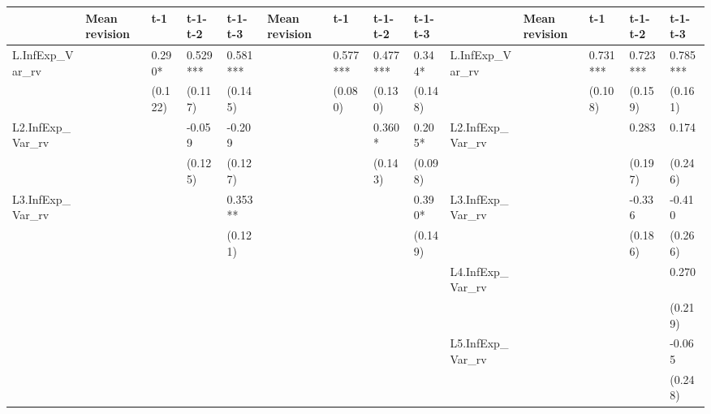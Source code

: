 \documentclass[12pt]{article}
\begin{document}
\begin{table}
\begin{adjustbox}{width={24cm},totalheight={14cm}}
\begin{threeparttable}
\begin{tabular}{llllllllllllll}
					\hline                                                                                                                     
					& Mean revision & t-1       & t-1- t-2 & t-1-t-3  & Mean revision & t-1       & t-1- t-2  & t-1-t-3   &                     & Mean revision & t-1      & t-1- t-2 & t-1-t-3  \\
					\hline 
					L.InfExp\_Var\_rv   &               & 0.290*    & 0.529*** & 0.581*** &               & 0.577***  & 0.477***  & 0.344*    & L.InfExp\_Var\_rv   &               & 0.731*** & 0.723*** & 0.785*** \\
					&               & (0.122)   & (0.117)  & (0.145)  &               & (0.080)   & (0.130)   & (0.148)   &                     &               & (0.108)  & (0.159)  & (0.161)  \\
					L2.InfExp\_Var\_rv  &               &           & -0.059   & -0.209   &               &           & 0.360*    & 0.205*    & L2.InfExp\_Var\_rv  &               &          & 0.283    & 0.174    \\
					&               &           & (0.125)  & (0.127)  &               &           & (0.143)   & (0.098)   &                     &               &          & (0.197)  & (0.246)  \\
					L3.InfExp\_Var\_rv  &               &           &          & 0.353**  &               &           &           & 0.390*    & L3.InfExp\_Var\_rv  &               &          & -0.336   & -0.410   \\
					&               &           &          & (0.121)  &               &           &           & (0.149)   &                     &               &          & (0.186)  & (0.266)  \\
					&               &           &          &          &               &           &           &           & L4.InfExp\_Var\_rv  &               &          &          & 0.270    \\
					&               &           &          &          &               &           &           &           &                     &               &          &          & (0.219)  \\
					&               &           &          &          &               &           &           &           & L5.InfExp\_Var\_rv  &               &          &          & -0.065   \\
					&               &           &          &          &               &           &           &           &                     &               &          &          & (0.248)  \\

\end{tabular}
\end{threeparttable}
\end{adjustbox}
\end{table}
\end{document}
